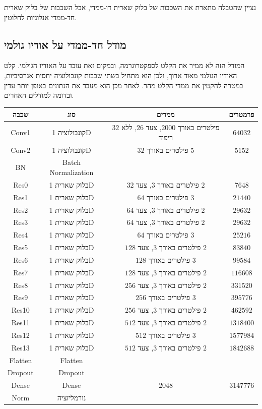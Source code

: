 \documentclass[hebrew, a4paper]{article}
\theoremstyle{plain}
\theoremstyle{definition}
\numberwithin{equation}{section}
\begin{document}
נציין שהטבלה מתארת את השכבות של בלוק שארית דו-ממדי, אבל השכבות של בלוק
שארית חד-ממדי אנלוגיות לחלוטין.

\subsection{מודל חד-ממדי על אודיו גולמי}
\label{sec:architecture-audiocnn}

המודל הזה לא ממיר את הקלט לספקטרוגרמה, ובמקום זאת עובד על האודיו
הגולמי. קלט האודיו הגולמי מאוד ארוך, ולכן הוא מתחיל בשתי שכבות
קונבולוציה יחסית אגרסיביות, במטרה להקטין את ממדי הקלט מהר. לאחר מכן
הוא מעבד את הנתונים באופן יותר עדין ובדומה למודלים האחרים.

\begin{center}
  \begin{tabular}{cccc}
    שכבה & סוג & ממדים & פרמטרים \\\hline
    Conv1 & קונבולוציה 1D & $32$ פילטרים באורך $\num{2000}$, צעד $26$, ללא ריפוד & $\num{64032}$ \\
    Conv2 & קונבולוציה 1D & $32$ פילטרים באורך $5$ & $\num{5152}$ \\
    BN & Batch Normalization & & \\
    Res0 & בלוק שארית 1D & $32$ פילטרים באורך $3$, צעד $2$ & $\num{7648}$ \\
    Res1 & בלוק שארית 1D & $64$ פילטרים באורך $3$ & $\num{21440}$ \\
    Res2 & בלוק שארית 1D & $64$ פילטרים באורך $3$, צעד $2$ & $\num{29632}$ \\
    Res3 & בלוק שארית 1D & $64$ פילטרים באורך $3$, צעד $2$ & $\num{29632}$ \\
    Res4 & בלוק שארית 1D & $64$ פילטרים באורך $3$ & $\num{25216}$ \\
    Res5 & בלוק שארית 1D & $128$ פילטרים באורך $3$, צעד $2$ & $\num{83840}$ \\
    Res6 & בלוק שארית 1D & $128$ פילטרים באורך $3$ & $\num{99584}$ \\
    Res7 & בלוק שארית 1D & $128$ פילטרים באורך $3$, צעד $2$ & $\num{116608}$ \\
    Res8 & בלוק שארית 1D & $256$ פילטרים באורך $3$, צעד $2$ & $\num{331520}$ \\
    Res9 & בלוק שארית 1D & $256$ פילטרים באורך $3$ & $\num{395776}$ \\
    Res10 & בלוק שארית 1D & $256$ פילטרים באורך $3$, צעד $2$ & $\num{462592}$ \\
    Res11 & בלוק שארית 1D & $512$ פילטרים באורך $3$, צעד $2$ & $\num{1318400}$ \\
    Res12 & בלוק שארית 1D & $512$ פילטרים באורך $3$ & $\num{1577984}$ \\
    Res13 & בלוק שארית 1D & $512$ פילטרים באורך $3$, צעד $2$ & $\num{1842688}$ \\
    Flatten & Flatten & & \\
    Dropout & Dropout & & \\
    Dense & Dense & $\num{2048}$ & $\num{3147776}$ \\
    Norm & נורמליזציה & &
  \end{tabular}
\end{center}
\end{document}

